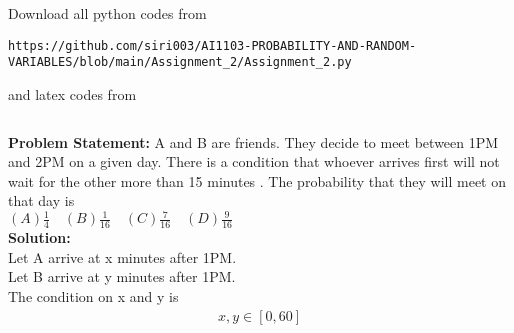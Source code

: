 \documentclass[journal,12pt,twocolumn]{IEEEtran}
\begin{document}
\maketitle
\newpage
\bigskip
\renewcommand{\thefigure}{\theenumi}
\renewcommand{\thetable}{\theenumi}
Download all python codes from 
\begin{lstlisting}
https://github.com/siri003/AI1103-PROBABILITY-AND-RANDOM-VARIABLES/blob/main/Assignment_2/Assignment_2.py
\end{lstlisting}
%
and latex codes from 
%
\begin{lstlisting}

\end{lstlisting}
\textbf{Problem Statement:} A and B are friends. They decide to meet between 1PM and 2PM on a given day. There is a condition that whoever arrives first will not wait for the other more than 15 minutes . The probability that they will meet on that day is \newline
\\
$(A)\frac{1}{4} \quad (B)\frac{1}{16} \quad (C)\frac{7}{16} \quad (D)\frac{9}{16}$ 
\\
\textbf{Solution:}
\\
Let A arrive at x minutes after 1PM.
\\
Let B arrive at y minutes after 1PM.
\\
The condition on x and y is 
\begin{align}
    x,y \in [0,60]
    \label{eq:eq1}
\end{align}
\end{document}
